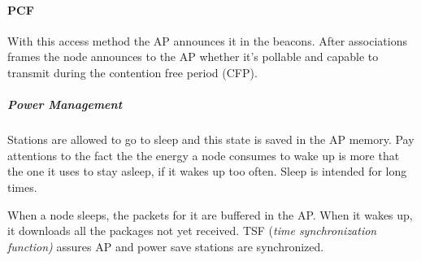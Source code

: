\paragraph*{PCF} With this access method the AP announces it in the beacons.
After associations frames the node announces to the AP whether it's pollable
and capable to transmit during the contention free period (CFP).

\subparagraph*{Power Management}
Stations are allowed to go to sleep and this state is saved in the AP memory.
Pay attentions to the fact the the energy a node consumes to wake up is more
that the one it uses to stay asleep, if it wakes up too often. Sleep is intended
for long times.

When a node sleeps, the packets for it are buffered in the AP. When it wakes up,
it downloads all the packages not yet received. TSF (\textit{time
  synchronization function)} assures AP and power save stations are
synchronized.
